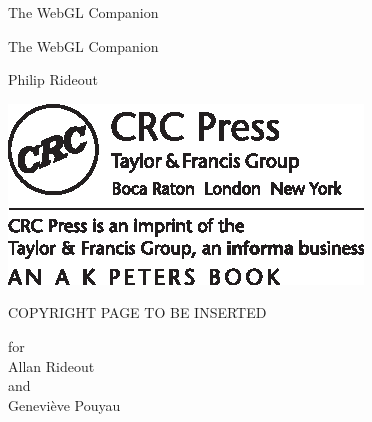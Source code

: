 \vspace*{1in}

 \begin{flushright}
 \setlength{\baselineskip}{30pt}
 {\MTSMALL The WebGL Companion}
 \end{flushright}

\newpage

\phantom{Xx}

\newpage


 \begin{flushright}
 \setlength{\baselineskip}{36pt}
 {{\MT The WebGL Companion}\\{\MTSUB }}

\vspace{1in}

 \setlength{\baselineskip}{22pt}
 {\MTA Philip Rideout}

\vfill

\includegraphics{AKPeters_TitlePageLogo.eps}

 \end{flushright}

\newpage

COPYRIGHT PAGE TO BE INSERTED

\newpage


\vspace*{1in}


\begin{flushright}
 \setlength{\baselineskip}{13.5pt}
{\MTD for \\
Allan Rideout \\
and \\
Genevi\`{e}ve Pouyau}
\end{flushright}

\newpage
\strut
